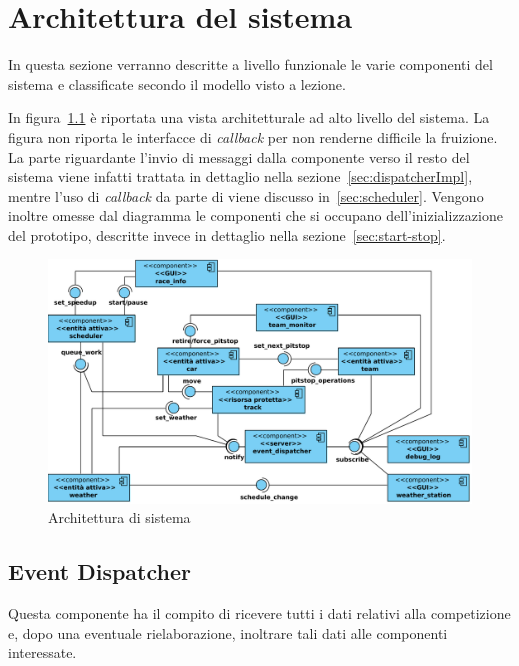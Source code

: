 \chapter{Architettura del sistema}
\label{ch:architettura}

In questa sezione verranno descritte a livello funzionale le varie componenti del sistema e classificate secondo il modello visto a lezione.

In figura~\ref{fig:architettura} è riportata una vista architetturale ad alto livello del sistema. La figura non riporta le interfacce di \textit{callback} per non renderne difficile la fruizione. La parte riguardante l'invio di messaggi dalla componente \evdisp{} verso il resto del sistema viene infatti trattata in dettaglio nella sezione~\ref{sec:dispatcherImpl}, mentre l'uso di \textit{callback} da parte di \sched{} viene discusso in~\ref{sec:scheduler}. Vengono inoltre omesse dal diagramma le componenti che si occupano dell'inizializzazione del prototipo, descritte invece in dettaglio nella sezione~\ref{sec:start-stop}.

\begin{landscape}
\begin{figure}
\includegraphics[height=.42\paperheight]{diagrammi/Arch}
\caption{Architettura di sistema}
\label{fig:architettura}
\end{figure}
\end{landscape}

\section{Event Dispatcher}
\label{sec:dispatcherArch}
Questa componente ha il compito di ricevere tutti i dati relativi alla competizione e, dopo una eventuale rielaborazione, inoltrare tali dati alle componenti interessate.

